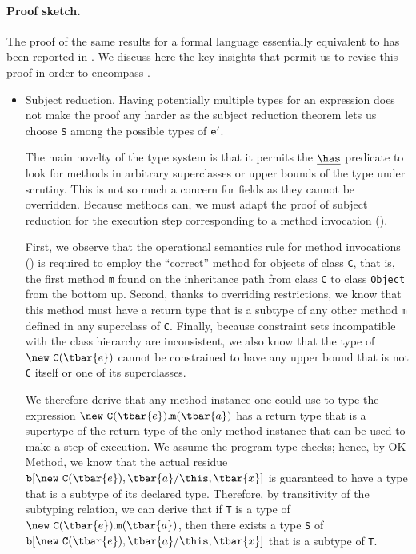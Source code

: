 \paragraph{Proof sketch.} The proof of the same results for a
formal language essentially equivalent to \FXD{} has been
reported in \cite{constrained-types}. We discuss here the key
insights that permit us to revise this proof in order to encompass \FXGD{}.
\begin{itemize}
\item Subject reduction. Having potentially multiple types for
an expression does not make the proof any harder as the subject
reduction theorem lets us choose {\tt S} among the possible types of ${\tt e}'$.

The main novelty of the \FXG{} type system is that it permits
the $\underline\has$ predicate to look for methods in arbitrary
superclasses or upper bounds of the type under scrutiny. This is
not so much a concern for fields as they cannot be overridden.
Because methods can, we must adapt the proof of subject reduction for the execution step corresponding to a method invocation (\RInvk).

First, we observe that the operational semantics rule for method
invocations (\RInvk) is required to employ the ``correct''
method for objects of class {\tt C}, that is, the first method
{\tt m} found on the inheritance path from class {\tt C} to
class {\tt Object} from the bottom up. Second, thanks
to overriding restrictions, we know that this method must have a
return type that is a subtype of any other method {\tt m}
defined in any superclass of {\tt C}. Finally, because
constraint sets incompatible with the class hierarchy are
inconsistent, we also know that the type of
$\new~{\tt C}(\tbar{e})$ cannot be constrained to have any upper
bound that is not {\tt C} itself or one of its superclasses.

We
therefore derive that any method instance one could use to type
the expression $\new~{\tt C}(\tbar{e}).{\tt m}(\tbar{a})$ has a
return type that is a supertype of the return type of the only
method instance that can be used to make a step of execution. We
assume the program type checks; hence, by {\sc OK-Method}, we
know that the actual residue ${\tt b}[\new~{\tt C}(\tbar{e}),\tbar{a}/\this,\tbar{x}]$ is guaranteed to have a
type that is a subtype of its declared type. Therefore, by
transitivity of the subtyping relation, we can derive that if
{\tt T} is a type of $\new~{\tt C}(\tbar{e}).{\tt m}(\tbar{a})$,
then there exists a type {\tt S} of
${\tt b}[\new~{\tt C}(\tbar{e}),\tbar{a}/\this,\tbar{x}]$
that is a subtype of {\tt T}.


\end{itemize}
